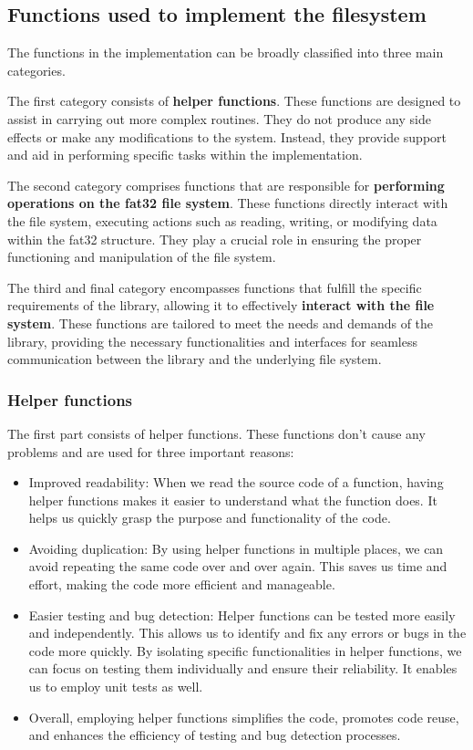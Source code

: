 \subsection{Functions used to implement the filesystem}

The functions in the implementation can be broadly classified into three main categories.

The first category consists of \textbf{helper functions}. These functions are designed to assist in carrying out more complex routines. They do not produce any side effects or make any modifications to the system. Instead, they provide support and aid in performing specific tasks within the implementation.

The second category comprises functions that are responsible for \textbf{performing operations on the fat32 file system}. These functions directly interact with the file system, executing actions such as reading, writing, or modifying data within the fat32 structure. They play a crucial role in ensuring the proper functioning and manipulation of the file system.

The third and final category encompasses functions that fulfill the specific requirements of the library, allowing it to effectively \textbf{interact with the file system}. These functions are tailored to meet the needs and demands of the library, providing the necessary functionalities and interfaces for seamless communication between the library and the underlying file system.

\subsubsection{Helper functions}

The first part consists of helper functions. These functions don't cause any problems and are used for three important reasons:
\begin{itemize}
    \item Improved readability: When we read the source code of a function, having helper functions makes it easier to understand what the function does. It helps us quickly grasp the purpose and functionality of the code. 

    \item Avoiding duplication: By using helper functions in multiple places, we can avoid repeating the same code over and over again. This saves us time and effort, making the code more efficient and manageable.

    \item Easier testing and bug detection: Helper functions can be tested more easily and independently. This allows us to identify and fix any errors or bugs in the code more quickly. By isolating specific functionalities in helper functions, we can focus on testing them individually and ensure their reliability. It enables us to employ unit tests as well.

    \item Overall, employing helper functions simplifies the code, promotes code reuse, and enhances the efficiency of testing and bug detection processes.
\end{itemize}

